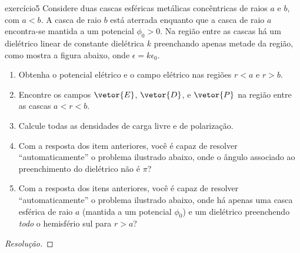 \begin{exercício}{}{exercício5}
    Considere duas cascas esféricas metálicas concêntricas de raios \(a\) e \(b\), com \(a < b\). A casca de raio \(b\) está aterrada enquanto que a casca de raio \(a\) encontra-se mantida a um potencial \(\phi_0 > 0\). Na região entre as cascas há um dielétrico linear de constante dielétrica \(k\) preenchando apenas metade da região, como mostra a figura abaixo, onde \(\epsilon = k \epsilon_0\).

    \begin{enumerate}[label=(\alph*)]
        \item Obtenha o potencial elétrico e o campo elétrico nas regiões \(r < a\) e \(r > b\).
        \item Encontre os campos \(\vetor{E}\), \(\vetor{D}\), e \(\vetor{P}\) na região entre as cascas \(a < r < b\).
        \item Calcule todas as densidades de carga livre e de polarização.
        \item Com a resposta dos item anteriores, você é capaz de resolver \enquote{automaticamente} o problema ilustrado abaixo, onde o ângulo associado ao preenchimento do dielétrico não é \(\pi\)?
        \item Com a resposta dos itens anteriores, você é capaz de resolver \enquote{automaticamente} o problema ilustrado abaixo, onde há apenas uma casca esférica de raio \(a\) (mantida a um potencial \(\phi_0\)) e um dielétrico preenchendo \emph{todo} o hemisfério sul para \(r > a\)?
    \end{enumerate}
\end{exercício}
\begin{proof}[Resolução]

\end{proof}
